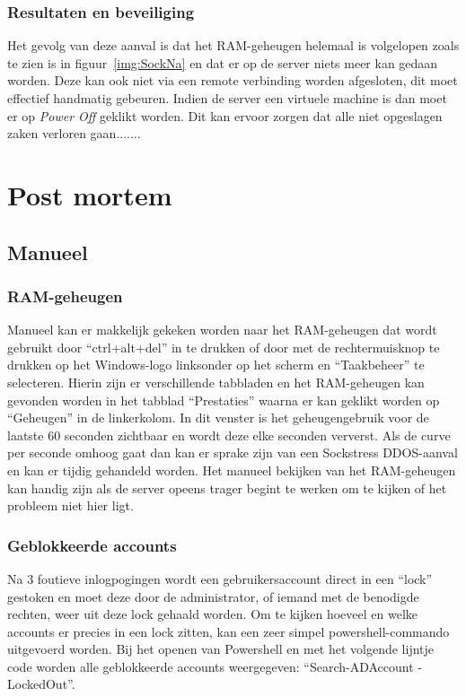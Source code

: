 \documentclass[pdftex,a4paper,12pt]{report}
\begin{document}
\subsection{Resultaten en beveiliging}
Het gevolg van deze aanval is dat het RAM-geheugen helemaal is volgelopen zoals te zien is in figuur~\ref{img:SockNa} en dat er op de server niets meer kan gedaan worden. Deze kan ook niet via een remote verbinding worden afgesloten, dit moet effectief handmatig gebeuren. Indien de server een virtuele machine is dan moet er op \textit{Power Off} geklikt worden. Dit kan ervoor zorgen dat alle niet opgeslagen zaken verloren gaan....... 












\chapter{Post mortem}
\section{Manueel}
\subsection{RAM-geheugen}
Manueel kan er makkelijk gekeken worden naar het RAM-geheugen dat wordt gebruikt door "`ctrl+alt+del"' in te drukken of door met de rechtermuisknop te drukken op het Windows-logo linksonder op het scherm en "`Taakbeheer"' te selecteren. Hierin zijn er verschillende tabbladen en het RAM-geheugen kan gevonden worden in het tabblad "`Prestaties"' waarna er kan geklikt worden op "`Geheugen"' in de linkerkolom. In dit venster is het geheugengebruik voor de laatste 60 seconden zichtbaar en wordt deze elke seconden ververst. Als de curve per seconde omhoog gaat dan kan er sprake zijn van een Sockstress DDOS-aanval en kan er tijdig gehandeld worden. Het manueel bekijken van het RAM-geheugen kan handig zijn als de server opeens trager begint te werken om te kijken of het probleem niet hier ligt.

\subsection{Geblokkeerde accounts}
Na 3 foutieve inlogpogingen wordt een gebruikersaccount direct in een "`lock"' gestoken en moet deze door de administrator, of iemand met de benodigde rechten, weer uit deze lock gehaald worden. Om te kijken hoeveel en welke accounts er precies in een lock zitten, kan een zeer simpel powershell-commando uitgevoerd worden. Bij het openen van Powershell en met het volgende lijntje code worden alle geblokkeerde accounts weergegeven: "`Search-ADAccount -LockedOut"'. \newline 
\end{document}
